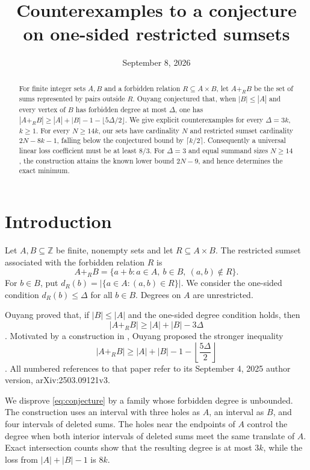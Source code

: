 \documentclass[11pt]{article}
\title{Counterexamples to a conjecture on one-sided restricted sumsets}
\author{}
\date{September 8, 2026}
\newcommand{\Z}{\mathbb Z}
\newcommand{\res}{\mathbin{+_{R}}}
\begin{document}
\maketitle
\begin{abstract}
For finite integer sets $A,B$ and a forbidden relation $R\subseteq A\times B$, let $A\res B$ be the set of sums represented by pairs outside $R$. Ouyang conjectured that, when $|B|\leq |A|$ and every vertex of $B$ has forbidden degree at most $\Delta$, one has $|A\res B|\geq |A|+|B|-1-\lfloor 5\Delta/2\rfloor$. We give explicit counterexamples for every $\Delta=3k$, $k\geq1$. For every $N\geq14k$, our sets have cardinality $N$ and restricted sumset cardinality $2N-8k-1$, falling below the conjectured bound by $\lceil k/2\rceil$. Consequently a universal linear loss coefficient must be at least $8/3$. For $\Delta=3$ and equal summand sizes $N\geq14$, the construction attains the known lower bound $2N-9$, and hence determines the exact minimum.
\end{abstract}

\section{Introduction}
Let $A,B\subseteq\Z$ be finite, nonempty sets and let $R\subseteq A\times B$. The restricted sumset associated with the forbidden relation $R$ is
\[
 A\res B=\{a+b:a\in A,\ b\in B,\ (a,b)\notin R\}.
\]
For $b\in B$, put $d_R(b)=|\{a\in A:(a,b)\in R\}|$. We consider the one-sided condition $d_R(b)\leq\Delta$ for all $b\in B$. Degrees on $A$ are unrestricted.

Ouyang proved that, if $|B|\leq|A|$ and the one-sided degree condition holds, then
\begin{equation}\label{eq:known}
 |A\res B|\geq |A|+|B|-3\Delta
\end{equation}
\cite[Theorem 1.5(i)]{Ouyang}. Motivated by a construction in \cite[Theorem 1.9]{Ouyang}, Ouyang proposed the stronger inequality
\begin{equation}\label{eq:conjecture}
 |A\res B|\geq |A|+|B|-1-\left\lfloor\frac{5\Delta}{2}\right\rfloor
\end{equation}
\cite[Conjecture 1.10]{Ouyang}. All numbered references to that paper refer to its September 4, 2025 author version, arXiv:2503.09121v3.

We disprove \eqref{eq:conjecture} by a family whose forbidden degree is unbounded. The construction uses an interval with three holes as $A$, an interval as $B$, and four intervals of deleted sums. The holes near the endpoints of $A$ control the degree when both interior intervals of deleted sums meet the same translate of $A$. Exact intersection counts show that the resulting degree is at most $3k$, while the loss from $|A|+|B|-1$ is $8k$.
\end{document}
